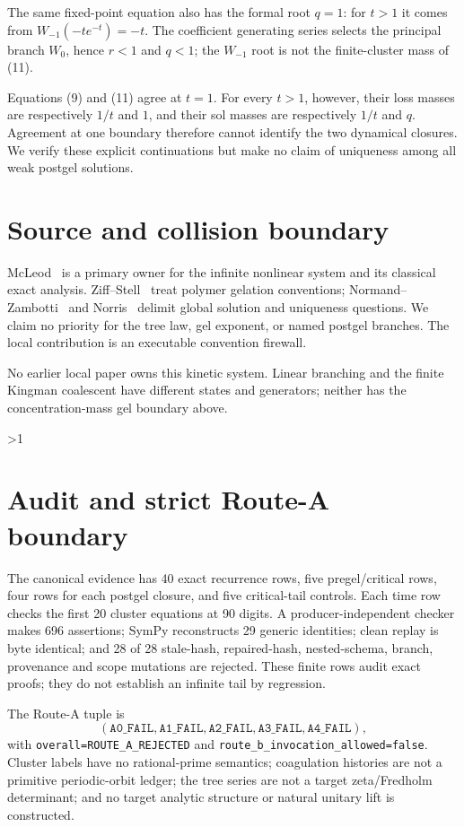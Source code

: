 \documentclass[11pt]{article}
\begin{document}
The same fixed-point equation also has the formal root $q=1$: for $t>1$ it
comes from $W_{-1}(-te^{-t})=-t$.  The coefficient generating series selects
the principal branch $W_0$, hence $r<1$ and $q<1$; the $W_{-1}$ root is not the
finite-cluster mass of (11).

Equations (9) and (11) agree at $t=1$.  For every $t>1$, however, their loss
masses are respectively $1/t$ and $1$, and their sol masses are respectively
$1/t$ and $q$.  Agreement at one boundary therefore cannot identify the two
dynamical closures.  We verify these explicit continuations but make no claim
of uniqueness among all weak postgel solutions.

\section{Source and collision boundary}
McLeod~\cite{mcleod1,mcleod2} is a primary owner for the infinite nonlinear
system and its classical exact analysis.  Ziff--Stell~\cite{ziffstell} treat
polymer gelation conventions; Normand--Zambotti~\cite{nz} and
Norris~\cite{norris} delimit global solution and uniqueness questions.  We
claim no priority for the tree law, gel exponent, or named postgel branches.
The local contribution is an executable convention firewall.

No earlier local paper owns this kinetic system.  Linear branching and the
finite Kingman coalescent have different states and generators; neither has
the concentration-mass gel boundary above.
\fi

\ifnum\CRevisionRound>1
\section{Audit and strict Route-A boundary}
The canonical evidence has 40 exact recurrence rows, five pregel/critical
rows, four rows for each postgel closure, and five critical-tail controls.
Each time row checks the first 20 cluster equations at 90 digits.  A
producer-independent checker makes 696 assertions; SymPy reconstructs 29 generic
identities; clean replay is byte identical; and 28 of 28 stale-hash,
repaired-hash, nested-schema, branch, provenance and scope mutations are
rejected.  These finite rows audit exact proofs; they do not establish an
infinite tail by regression.

The Route-A tuple is
\[
 (\mathtt{A0\_FAIL},\mathtt{A1\_FAIL},\mathtt{A2\_FAIL},
  \mathtt{A3\_FAIL},\mathtt{A4\_FAIL}),
\]
with \texttt{overall=ROUTE\_A\_REJECTED} and
\texttt{route\_b\_invocation\_allowed=false}.  Cluster labels have no
rational-prime semantics; coagulation histories are not a primitive
periodic-orbit ledger; the tree series are not a target zeta/Fredholm determinant; and
no target analytic structure or natural unitary lift is constructed.
\fi
\end{document}
